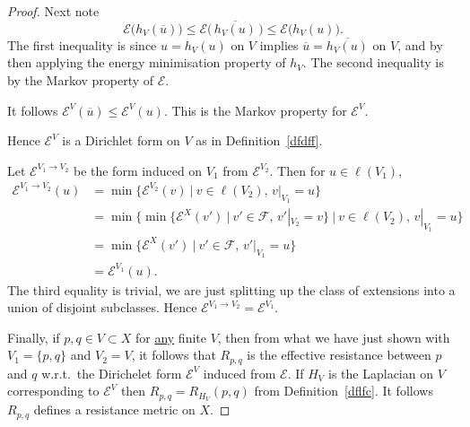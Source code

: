 \documentclass[a4paper]{amsart}
\theoremstyle{plain}
\theoremstyle{definition}
\theoremstyle{remark}
\begin{document}
\begin{proof}
Next note
\[
\mathcal{E} \big( h_V(\overline{u}) \big) \leq \mathcal{E} \big(\, \overline{h_V(u)}\,  \big) \leq \mathcal{E} \big ( h_V(u) \big).
\]
The first inequality is since $ u = h_V(u) $ on $ V $ implies $ \overline{u} = \overline{h_V(u)} $ on $ V $, and by then applying the energy minimisation property of $ h_V $.  The second inequality is by the Markov property of $ \mathcal{E} $.

It follows $ \mathcal{E} ^ V ( \overline{u}) \leq \mathcal{E} ^V (u) $.  This is the Markov property for $ \mathcal{E}^V $.  

Hence $ \mathcal{E} ^V  $ is a Dirichlet form on $ V $  as in Definition~\ref{dfdff}. 

\medskip
Let $ \mathcal{E} ^{V_1\to V_2 }  $  be the form induced on $ V_1 $ from $ \mathcal{E} ^{V_2} $. Then for $ u \in \ell(V_1) $,
\begin{align*}
 \mathcal{E} ^{V_1\to V_2 }(u) &= \min \big\{ \mathcal{E} ^{V_2} (v) \ \big| \ v \in \ell(V_2),\, v|_{V_1} = u \big\} \\
    &=    \min \Big\{     \min         \big\{ \mathcal{E} ^{X} (v') \ \big| \ v' \in \mathcal{F} ,\, v'|_{V_2} = v \big\} 
                  \ \Big| \ v \in \ell(V_2),\, v|_{V_1} = u \Big\}    \\
             &=        \min         \big\{ \mathcal{E} ^{X} (v') \ \big| \ v' \in \mathcal{F} ,\, v'|_{V_1} = u \big\}   \\
             &=  \mathcal{E} ^{V_1} (u).     
\end{align*} 
The third equality is trivial, we are just splitting up the class of extensions into a union of disjoint subclasses.  Hence $\mathcal{E} ^{V_1\to V_2 } = \mathcal{E} ^{V_1 } $.

\medskip Finally, if $ p,q \in V \subset X $ for \underline{any} finite $ V $, then from what we have just shown with $ V_1= \{ p,q\}$ and $ V_2 = V $, it follows that $ R_{p,q} $ is the effective resistance between $ p $ and $ q $ w.r.t.\ the Dirichelet form $ \mathcal{E} ^V $ induced from $ \mathcal{E} $. If $ H_V $ is the Laplacian on $ V $ corresponding to $ \mathcal{E} ^V $ then $ R_{p,q} = R_{H_V}(p,q) $ from Definition~\ref{dflfc}.  It follows $ R_{p,q} $ defines a resistance metric on $ X $.
\end{proof} 



\end{document}
